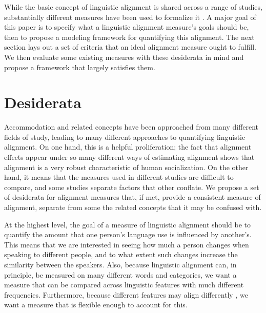 \documentclass{acm_proc_article-sp}
\begin{document}
While the basic concept of linguistic alignment is shared across a range of studies, substantially different measures have been used to formalize it \cite{IrelandEtAl2011,DNMGamonDumais2011,FusaroliEtAl2012}. A major goal of this paper is to specify what a linguistic alignment measure's goals should be, then to propose a modeling framework for quantifying this alignment.  The next section lays out a set of criteria that an ideal alignment measure ought to fulfill.  We then evaluate some existing measures with these desiderata in mind and propose a framework that largely satisfies them.



\section{Desiderata}
Accommodation and related concepts have been approached from many different fields of study, leading to many different approaches to quantifying linguistic alignment. On one hand, this is a helpful proliferation; the fact that alignment effects appear under so many different ways of estimating alignment shows that alignment is a very robust characteristic of human socialization.  On the other hand, it means that the measures used in different studies are difficult to compare, and some studies separate factors that other conflate. We propose a set of desiderata for alignment measures that, if met, provide a consistent measure of alignment, separate from some the related concepts that it may be confused with.

At the highest level, the goal of a measure of linguistic alignment should be to quantify the amount that one person's language use is influenced by another's. This means that we are interested in seeing how much a person changes when speaking to different people, and to what extent such changes increase the similarity between the speakers. Also, because linguistic alignment can, in principle, be measured on many different words and categories, we want a measure that can be compared across linguistic features with much different frequencies.  Furthermore, because different features may align differently \cite{Ferrara1991}, we want a measure that is flexible enough to account for this.
\end{document}
